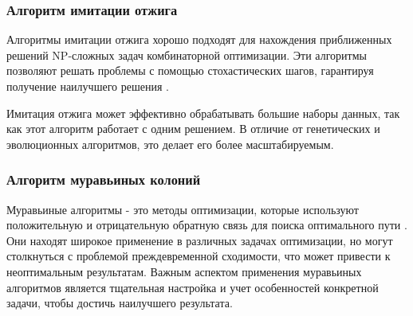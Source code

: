 \subsubsection{Алгоритм имитации отжига}

Алгоритмы имитации отжига хорошо подходят для нахождения приближенных решений NP-сложных задач комбинаторной оптимизации. Эти алгоритмы позволяют решать проблемы с помощью стохастических шагов, гарантируя получение наилучшего решения \cite{Kalashnikov_2004}.

Имитация отжига может эффективно обрабатывать большие наборы данных, так как этот алгоритм работает с одним решением. В отличие от генетических и эволюционных алгоритмов, это делает его более масштабируемым.

\subsubsection{Алгоритм муравьиных колоний}

Муравьиные алгоритмы - это методы оптимизации, которые используют положительную и отрицательную обратную связь для поиска оптимального пути \cite{Shtovba_2005}. Они находят широкое применение в различных задачах оптимизации, но могут столкнуться с проблемой преждевременной сходимости, что может привести к неоптимальным результатам. Важным аспектом применения муравьиных алгоритмов является тщательная настройка и учет особенностей конкретной задачи, чтобы достичь наилучшего результата.


